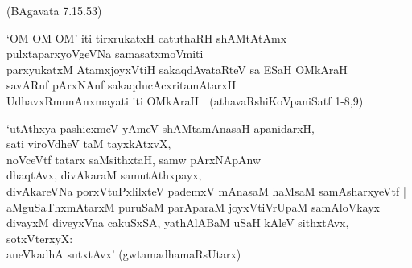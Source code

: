 \begin{itemize}
{\hfill{(BAgavata 7.15.53)}
\item[21.] `OM OM OM' iti tirxrukatxH catuthaRH shAMtAtAmx\\\label{146}
pulxtaparxyoVgeVNa samasatxmoVmiti\\
parxyukatxM AtamxjoyxVtiH sakaqdAvataRteV sa ESaH OMkAraH\\
savARnf pArxNAnf sakaqducAcxritamAtarxH \\
UdhavxRmunAnxmayati iti OMkAraH |
\hfill{(athavaRshiKoVpaniSatf 1-8,9)} 
\item[22.] `utAthxya pashicxmeV yAmeV shAMtamAnasaH apanidarxH,\\\label{146}
sati viroVdheV taM tayxkAtxvX,\\
noVceVtf tatarx saMsithxtaH, samw pArxNApAnw\\
dhaqtAvx, divAkaraM samutAthxpayx,\\
divAkareVNa porxVtuPxlilxteV pademxV mAnasaM haMsaM samAsharxyeVtf |\\
aMguSaThxmAtarxM puruSaM parAparaM joyxVtiVrUpaM samAloVkayx\\
divayxM diveyxVna cakuSxSA, yathAlABaM uSaH kAleV sithxtAvx, sotxVterxyX:\\
aneVkadhA sutxtAvx'
\hfill{(gwtamadhamaRsUtarx)}}
\end{itemize}

